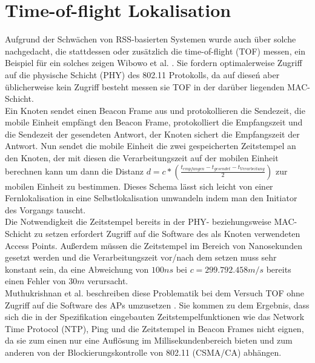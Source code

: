 \section{Time-of-flight Lokalisation}
\label{ch:Vorherige:sec:TOF}
Aufgrund der Schwächen von RSS-basierten Systemen wurde auch über solche nachgedacht, die stattdessen oder zusätzlich die time-of-flight (TOF) messen, ein Beispiel für ein solches zeigen Wibowo et al. \cite{wibowo2009time}. 
Sie fordern optimalerweise Zugriff auf die physische Schicht (PHY) des 802.11 Protokolls, da auf dieseń aber üblicherweise kein Zugriff besteht messen sie TOF in der darüber liegenden MAC-Schicht.\\
Ein Knoten sendet einen Beacon Frame aus und protokollieren die Sendezeit, die mobile Einheit empfängt den Beacon Frame, protokolliert die Empfangszeit und die Sendezeit der gesendeten Antwort, der Knoten sichert die Empfangszeit der Antwort.
Nun sendet die mobile Einheit die zwei gespeicherten Zeitstempel an den Knoten, der mit diesen die Verarbeitungszeit auf der mobilen Einheit berechnen kann um dann die Distanz $d = c*(\frac{t_{empfangen} - t_{gesendet} - t_{Verarbeitung}}{2})$ zur mobilen Einheit zu bestimmen.
Dieses Schema lässt sich leicht von einer Fernlokalisation in eine Selbstlokalisation umwandeln indem man den Initiator des Vorgangs tauscht.\\
Die Notwendigkeit die Zeitstempel bereits in der PHY- beziehungsweise MAC-Schicht zu setzen erfordert Zugriff auf die Software des als Knoten verwendeten Access Points. 
Außerdem müssen die Zeitstempel im Bereich von Nanosekunden gesetzt werden und die Verarbeitungszeit vor/nach dem setzen muss sehr konstant sein, da eine Abweichung von $100ns$ bei $c = 299.792.458m/s$ bereits einen Fehler von $30m$ verursacht.\\
Muthukrishnan et al. beschreiben diese Problematik bei dem Versuch TOF ohne Zugriff auf die Software des APs umzusetzen \cite{muthukrishnan2006using}.
Sie kommen zu dem Ergebnis, dass sich die in der Spezifikation eingebauten Zeitstempelfunktionen wie das Network Time Protocol (NTP), Ping und die Zeitstempel in Beacon Frames nicht eignen, da sie zum einen nur eine Auflösung im Millisekundenbereich bieten und zum anderen von der Blockierungskontrolle von 802.11 (CSMA/CA) abhängen.

